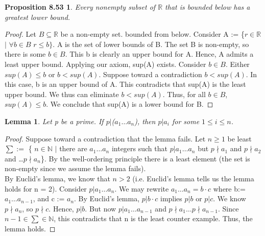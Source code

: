\documentclass[12pt]{amsart}
\newcommand{\N}{\mathbb{N}}
\newcommand{\R}{\mathbb{R}}
\begin{document}
\newtheorem*{prop8.53}{Proposition 8.53}
\begin{prop8.53}
	Every nonempty subset of $\R$ that is bounded below has a greatest lower bound.
\end{prop8.53}

\begin{proof}
	Let $B \subseteq \R$ be a non-empty set. bounded from below. Consider A := \{$r \in \R$ $|$ $\forall b \in B$ $r \leq b\}$. A is the set of lower bounds of B. The set B is non-empty, so there is some $b \in B$. This b is clearly an upper bound for A. Hence, A admits a least upper bound. Applying our axiom, sup(A) exists. Consider $b \in B$. Either $sup(A) \leq b$ or $b < sup(A)$. Suppose toward a contradiction $b < sup(A)$. In this case, b is an upper bound of A. This contradicts that sup(A) is the least upper bound. We thus can eliminate $b < sup(A)$. Thus, for all $b \in B$, $sup(A) \leq b$. We conclude that sup(A) is a lower bound for B.
\end{proof}

\newtheorem*{lemma}{Lemma}
\begin{lemma}
	Let p be a prime. If $p | $($a_1 \dots a_{n}$), then $p | a_{i}$ for some $1 \leq i \leq n$.
\end{lemma}

\begin{proof}
	Suppose toward a contradiction that the lemma fails. Let $n \geq 1$ be least $\sum := $ \{ $n \in \N$ $|$ there are $a_1\dots a_n$ integers such that $p | a_1\dots a_n$ but $p \nmid a_1$ and $p \nmid a_2$ and \dots $p \nmid a_n$\}. By the well-ordering principle there is a least element (the set is non-empty since we assume the lemma fails).
	\\\indent By Euclid's lemma, we know that $n > 2$ (i.e. Euclid's lemma tells us the lemma holds for n = 2). Consider $p | a_1 \dots a_n$. We may rewrite $a_1\dots a_n = b \cdot c$ where b:= $a_1 \dots a_{n-1}$, and c := $a_n$. By Euclid's lemma, $p | b \cdot c$ implies $p | b$ or $p | c$. We know $p \nmid a_n$, so $p \nmid c$. Hence, $p | b$. But now $p | a_1 \dots a_{n-1}$ and $p \nmid a_1 \dots p \nmid a_{n-1}$. Since $n -1 \in \sum \in \N$, this contradicts that n is the least counter example. Thus, the lemma holds.
\end{proof}
\end{document}
